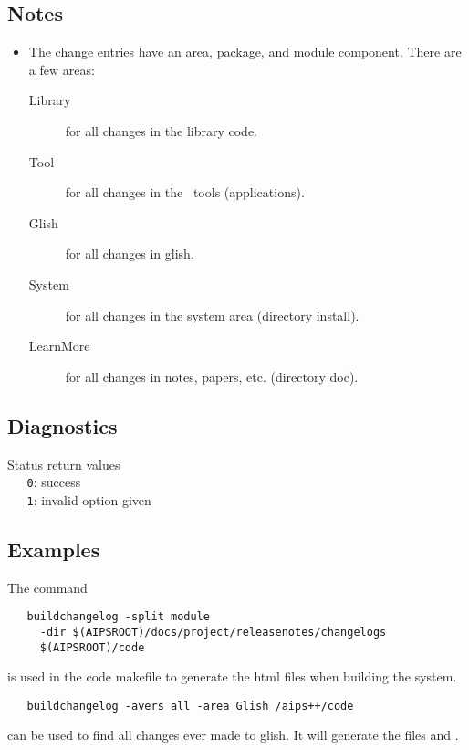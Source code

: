 \subsection*{Notes}

\begin{itemize}
\item
   The change entries have an area, package, and module component.
   There are a few areas:
   \begin{description}
     \item[Library]
       for all changes in the library code.
     \item[Tool]
       for all changes in the \aipspp\ tools (applications).
     \item[Glish]
       for all changes in glish.
     \item[System]
       for all changes in the system area (directory install).
     \item[LearnMore]
       for all changes in notes, papers, etc. (directory doc).
   \end{description}
\end{itemize}

\subsection*{Diagnostics}

Status return values
\\ \verb+   0+: success
\\ \verb+   1+: invalid option given

\subsection*{Examples}

The command

\begin{verbatim}
   buildchangelog -split module
     -dir $(AIPSROOT)/docs/project/releasenotes/changelogs
     $(AIPSROOT)/code
\end{verbatim}
\noindent
is used in the code makefile to generate the html files
when building the system.

\begin{verbatim}
   buildchangelog -avers all -area Glish /aips++/code
\end{verbatim}
\noindent
can be used to find all changes ever made to glish.
It will generate the files  and
.

